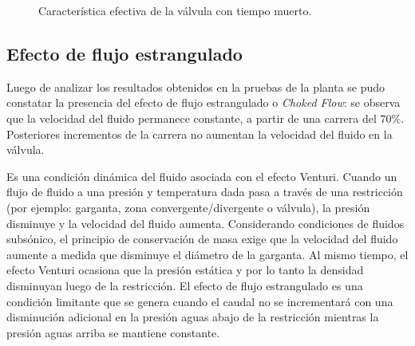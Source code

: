 \begin{figure}[ht]
  \centering
\caption{Característica efectiva de la válvula con tiempo muerto.}
\label{fig:valvulaCtiempoMuerto}
\end{figure}

\subsection{Efecto de flujo estrangulado}

Luego de analizar los resultados obtenidos en la pruebas de la planta se pudo
constatar la presencia del efecto de flujo estrangulado o \emph{Choked
Flow}: se observa que la velocidad del fluido permanece constante, a partir de
una carrera del $70\%$.
Posteriores incrementos de la carrera no aumentan la velocidad del fluido en la
válvula.

Es una condición dinámica del fluido asociada con el efecto Venturi.
Cuando un flujo de fluido a una presión y temperatura dada pasa a través de una
restricción (por ejemplo: garganta, zona convergente/divergente o válvula),
la presión disminuye y la velocidad del fluido aumenta.
Considerando condiciones de fluidos subsónico, el principio de conservación de
masa exige que la velocidad del fluido aumente a medida que disminuye el diámetro 
de la garganta. Al mismo tiempo, el efecto Venturi ocasiona que la presión estática
y por lo tanto la densidad disminuyan luego de la restricción. El efecto de flujo
estrangulado es una condición limitante que se genera cuando el caudal no se 
incrementará con una disminución adicional en la presión aguas abajo de la 
restricción mientras la presión aguas arriba se mantiene constante.

